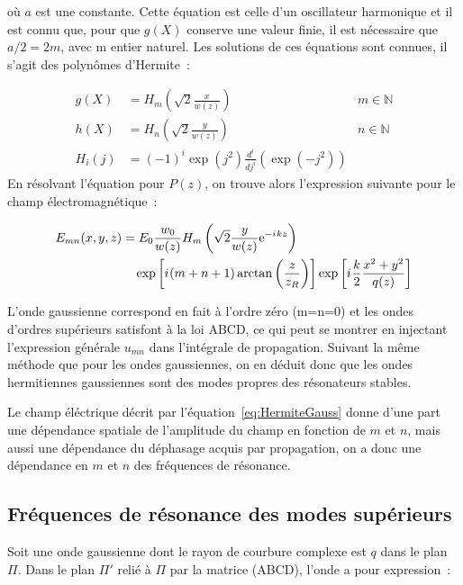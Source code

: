 \documentclass[a4paper]{book}
\newcommand{\iu}{{i\mkern1mu}}
\begin{document}
où $a$ est une constante. 
Cette équation est celle d'un oscillateur harmonique et il est connu que, pour que $g(X)$ conserve une valeur finie, il est nécessaire que $a/2=2m$, avec m entier naturel. Les solutions de ces équations sont connues, il s'agit des polynômes d'Hermite~:

\begin{align}
    g(X)&=H_m\left(\sqrt{2}\frac{x}{w(z)}\right)\quad&m\in\mathbb{N}\\
    h(X)&=H_n\left(\sqrt{2}\frac{y}{w(z)}\right)\quad&n\in\mathbb{N}\\
    H_i(j)&=(-1)^i\exp(j^2)\frac{d^i}{dj^i}\left(\exp(-j^2)\right)
\end{align}
En résolvant l'équation pour $P(z)$, on trouve alors l'expression suivante pour le champ électromagnétique~:

\begin{equation}
    \begin{split}
        E_{mn}(x,y,z)&=E_0\frac{w_0}{w(z)}H_m\left(\sqrt{2}\frac{y}{w(z)}\mathrm{e}^{-\iu k z}\right)\\
        &\quad\exp\left[\iu (m+n+1)\arctan\left(\frac{z}{z_R}\right)\right]\exp\left[\iu \frac{k}{2}\frac{x^2+y^2}{q(z)}\right]
        \label{eq:HermiteGauss}
    \end{split}
\end{equation}

L'onde gaussienne correspond en fait à l'ordre zéro (m=n=0) et les ondes d'ordres supérieurs satisfont à la loi ABCD, ce qui peut se montrer en injectant l'expression générale $u_{mn}$ dans l'intégrale de propagation.
Suivant la même méthode que pour les ondes gaussiennes, on en déduit donc que les ondes hermitiennes gaussiennes sont des modes propres des résonateurs stables.

Le champ éléctrique décrit par l'équation~\ref{eq:HermiteGauss} donne d'une part une dépendance spatiale de l'amplitude du champ en fonction de $m$ et $n$, mais aussi une dépendance du déphasage acquis par propagation, on a donc une dépendance en $m$ et $n$ des fréquences de résonance. 


\subsection{Fréquences de résonance des modes supérieurs}

Soit une onde gaussienne dont le rayon de courbure complexe est $q$ dans le plan $\Pi$.
Dans le plan $\Pi'$ relié à $\Pi$ par la matrice (ABCD), l'onde a pour expression~:
\end{document}
